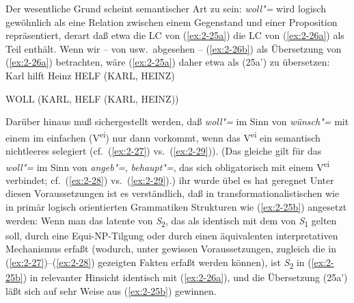 \documentclass[output=paper]{langsci/langscibook}
\begin{document}
Der wesentliche Grund scheint semantischer Art zu sein: \textit{woll"=} wird logisch gewöhnlich als eine Relation zwischen einem Gegenstand und einer Proposition repräsentiert, derart daß etwa die LC von (\ref{ex:2-25a}) die LC von (\ref{ex:2-26a}) als Teil enthält. Wenn wir -- von  usw.\  abgesehen -- (\ref{ex:2-26b}) als Übersetzung von (\ref{ex:2-26a}) betrachten, wäre (\ref{ex:2-25a}) daher etwa als (25a') zu übersetzen:
\eal
	\ex Karl hilft Heinz \label{ex:2-26a}
	\ex HELF (KARL, HEINZ) \label{ex:2-26b}
\zl
\begin{exe}
	\begin{xlist}[a'.]
		 \label{ex:2-25a'} WOLL (KARL, HELF (KARL, HEINZ))
	\end{xlist}
\end{exe}
Darüber hinaus muß sichergestellt werden, daß \textit{woll"=} im Sinn von \textit{wünsch"=} mit einem  im einfachen  (V\textsuperscript{ei}) nur dann vorkommt, wenn das V\textsuperscript{ei} ein semantisch nichtleeres  selegiert (cf.\ (\ref{ex:2-27}) vs.\ (\ref{ex:2-29})). (Das gleiche gilt für das  \textit{woll"=} im Sinn von \textit{angeb"=}, \textit{behaupt"=}, das sich obligatorisch mit einem V\textsuperscript{ei} verbindet; cf.\ (\ref{ex:2-28}) vs.\ (\ref{ex:2-29}).)
\eal \label{ex:2-27}
	 \label{ex:2-27a}
	 \label{ex:2-27b}
\zl
\eal \label{ex:2-28}
	 \label{ex:2-28a}
	 \label{ex:2-28b}
	 \label{ex:2-28c}
	 \label{ex:2-28d}
\zl
\eal \label{ex:2-29}
	\ex ihr wurde übel \label{ex:2-29a}
	\ex es hat geregnet \label{ex:2-29b}
\zl
Unter diesen Voraussetzungen ist es verständlich, daß in transformationalistischen wie in primär logisch orientierten Grammatiken Strukturen wie (\ref{ex:2-25b}) angesetzt werden: Wenn man das latente  von \textit{S}\textsubscript{2}, das als identisch mit dem  von \textit{S}\textsubscript{1} gelten soll, durch eine Equi-NP-Tilgung oder durch einen äquivalenten interpretativen Mechanismus erfaßt (wodurch, unter gewissen Voraussetzungen, zugleich die in
(\ref{ex:2-27})--(\ref{ex:2-28}) gezeigten Fakten erfaßt werden können), ist \textit{S}\textsubscript{2} in (\ref{ex:2-25b}) in relevanter Hinsicht identisch mit (\ref{ex:2-26a}), und die Übersetzung (25a') läßt sich auf sehr  Weise aus (\ref{ex:2-25b}) gewinnen.
\end{document}
